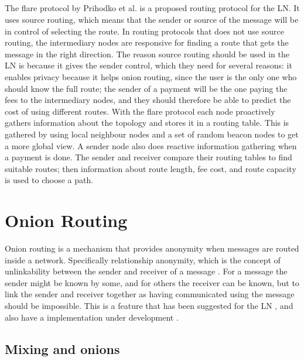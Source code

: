 \documentclass[informationsecurity]{gucmasterproject}
\begin{document}
\paragraph{}
The flare protocol by Prihodko et al.\cite{prihodko2016flare} is a proposed routing protocol for the LN. It uses source routing, which means that the sender or source of the message will be in control of selecting the route. In routing protocols that does not use source routing, the intermediary nodes are responsive for finding a route that gets the message in the right direction. The reason source routing should be used in the LN is because it gives the sender control, which they need for several reasons\cite{prihodko2016flare}: it enables privacy because it helps onion routing, since the user is the only one who should know the full route\cite{SB_onion}\cite{LN_onion_implementation}; the sender of a payment will be the one paying the fees to the intermediary nodes, and they should therefore be able to predict the cost of using different routes. With the flare protocol each node proactively gathers information about the topology and stores it in a routing table. This is gathered by using local neighbour nodes and a set of random beacon nodes to get a more global view. A sender node also does reactive information gathering when a payment is done. The sender and receiver compare their routing tables to find suitable routes; then information about route length, fee cost, and route capacity is used to choose a path. 

\chapter{Onion Routing}

Onion routing is a mechanism that provides anonymity when messages are routed inside a network. 
Specifically relationship anonymity, which is the concept of unlinkability between the sender and receiver of a message \cite{pfitzmann2001anonymity}. For a message the sender might be known by some, and for others the receiver can be known, but to link the sender and receiver together as having communicated using the message should be impossible. This is a feature that has been suggested for the LN \cite{LNDM_onion}\cite{SB_onion}, and also have a implementation under development \cite{LN_onion_implementation}.

\section{Mixing and onions}
\end{document}
